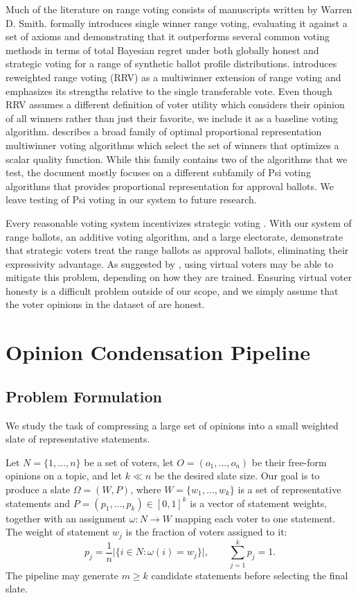 \documentclass[11pt]{article}
\begin{document}
Much of the literature on range voting consists of manuscripts written by Warren D. Smith. \citet{rangevoting-range-voting} formally introduces single winner range voting, evaluating it against a set of axioms and demonstrating that it outperforms several common voting methods in terms of total Bayesian regret under both globally honest and strategic voting for a range of synthetic ballot profile distributions. \citet{rangevoting-rrv} introduces reweighted range voting (RRV) as a multiwinner extension of range voting and emphasizes its strengths relative to the single transferable vote. Even though RRV assumes a different definition of voter utility which considers their opinion of all winners rather than just their favorite, we include it as a baseline voting algorithm. \citet{rangevoting-optimal-pr} describes a broad family of optimal proportional representation multiwinner voting algorithms which select the set of winners that optimizes a scalar quality function. While this family contains two of the algorithms that we test, the document mostly focuses on a different subfamily of Psi voting algorithms that provides proportional representation for approval ballots. We leave testing of Psi voting in our system to future research.

Every reasonable voting system incentivizes strategic voting \citep{gibbards-theorem}. With our system of range ballots, an additive voting algorithm, and a large electorate, \citet{preference-overstating} demonstrate that strategic voters treat the range ballots as approval ballots, eliminating their expressivity advantage. As suggested by \citet{rangevoting-range-voting, newberry-moral-parliaments}, using virtual voters may be able to mitigate this problem, depending on how they are trained. Ensuring virtual voter honesty is a difficult problem outside of our scope, and we simply assume that the voter opinions in the dataset of \citet{fish-v2} are honest.


\section{Opinion Condensation Pipeline}

\subsection{Problem Formulation}
We study the task of compressing a large set of opinions into a small weighted slate of representative statements.

Let \(N=\{1,\ldots,n\}\) be a set of voters, let \(O=(o_1,\ldots,o_n)\) be their free-form opinions on a topic, and let \(k \ll n\) be the desired slate size. Our goal is to produce a slate \(\Omega=(W,P)\), where \(W=\{w_1,\ldots,w_k\}\) is a set of representative statements and \(P=(p_1,\ldots,p_k)\in[0,1]^k\) is a vector of statement weights, together with an assignment \(\omega:N\to W\) mapping each voter to one statement. The weight of statement \(w_j\) is the fraction of voters assigned to it:
\[
p_j=\frac{1}{n}\bigl|\{i\in N:\omega(i)=w_j\}\bigr|,
\qquad
\sum_{j=1}^k p_j = 1.
\]
The pipeline may generate \(m \ge k\) candidate statements before selecting the final slate.
\end{document}
